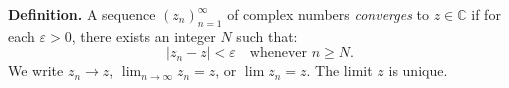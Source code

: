 \textbf{Definition.} A sequence $(z_n)_{n=1}^{\infty}$ of complex numbers \textit{converges} to $z \in \mathbb{C}$ if for each $\varepsilon > 0$, there exists an integer $N$ such that:
\[
|z_n - z| < \varepsilon \quad \text{whenever } n \geq N.
\]
We write $z_n \to z$, $\lim_{n \to \infty} z_n = z$, or $\lim z_n = z$. The limit $z$ is unique.

